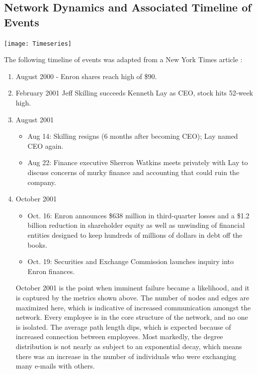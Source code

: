 \documentclass[12pt]{article}
\begin{document}
\subsection{Network Dynamics and Associated Timeline of Events}

\texttt{[image: Timeseries]}


The following timeline of events was adapted from a New York Times article \cite{nyttimeline}:
\renewcommand{\theenumi}{\Alph{enumi}}
\begin{enumerate}
\item August 2000 - Enron shares reach high of \$90.\\
\item February 2001 Jeff Skilling succeeds Kenneth Lay as CEO, stock hits 52-week high.\\

\item August  2001
	\begin{itemize}
		\item Aug 14: Skilling resigns (6 months after becoming CEO); Lay named CEO again.
		\item Aug 22: Finance executive Sherron Watkins meets privately with Lay to discuss concerns of murky finance and accounting that could ruin the company.
\end{itemize} 

\item October 2001
\begin{itemize}
	\item Oct. 16: Enron announces \$638 million in third-quarter losses and a \$1.2 billion reduction in shareholder equity as well as unwinding of financial entities designed to keep hundreds of millions of dollars in debt off the books.\\
	\item Oct. 19: Securities and Exchange Commission launches inquiry into Enron finances.\\
\end{itemize}

October 2001 is the point when imminent failure became a likelihood, and it is captured by the metrics shown above. The number of nodes and edges are maximized here, which is indicative of increased communication amongst the network. Every employee is in the core structure of the network, and no one is isolated. The average path length dips, which is expected because of increased connection between employees. Most markedly, the degree distribution is not nearly as subject to an exponential decay, which means there was an increase in the number of individuals who were exchanging many e-mails with others. 


\end{enumerate}
\end{document}
